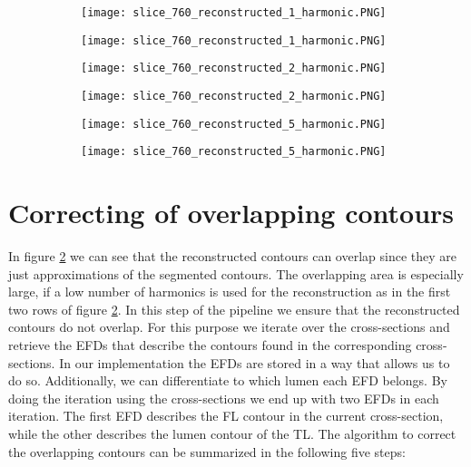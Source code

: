 \documentclass[thesis.tex]{subfiles}
\begin{document}
\begin{figure}
	\begin{subfigure}[t]{0.45\textwidth}
		\texttt{[image: slice\_760\_reconstructed\_1\_harmonic.PNG]}
	\caption{}
\label{fig:efds_reconstruction_a}		
	\end{subfigure}
\hspace{0.1\textwidth}
	\begin{subfigure}[t]{0.45\textwidth}
		\texttt{[image: slice\_760\_reconstructed\_1\_harmonic.PNG]}		
\caption{}	
	\end{subfigure}
	\begin{subfigure}[t]{0.45\textwidth}
		\texttt{[image: slice\_760\_reconstructed\_2\_harmonic.PNG]}
	\caption{}		
	\end{subfigure}
\hspace{0.1\textwidth}
	\begin{subfigure}[t]{0.45\textwidth}
		\texttt{[image: slice\_760\_reconstructed\_2\_harmonic.PNG]}		
\caption{}	
	\end{subfigure}
	\begin{subfigure}[t]{0.45\textwidth}
		\texttt{[image: slice\_760\_reconstructed\_5\_harmonic.PNG]}
	\caption{}		
	\end{subfigure}
\hspace{0.1\textwidth}
	\begin{subfigure}[t]{0.45\textwidth}
		\texttt{[image: slice\_760\_reconstructed\_5\_harmonic.PNG]}		
\caption{}	
	\end{subfigure}
	\caption{}

\label{fig:efds_reconstruction}
\end{figure}

\section{Correcting of overlapping contours}
In figure \ref{fig:efds_reconstruction} we can see that the reconstructed contours can overlap since they are just approximations of the segmented contours. The overlapping area is especially large, if a low number of harmonics is used for the reconstruction as in the first two rows of figure \ref{fig:efds_reconstruction}. In this step of the pipeline we ensure that the reconstructed contours do not overlap. For this purpose we iterate over the cross-sections and retrieve the EFDs that describe the contours found in the corresponding cross-sections. In our implementation the EFDs are stored in a way that allows us to do so. Additionally, we can differentiate to which lumen each EFD belongs. By doing the iteration using the cross-sections we end up with two EFDs in each iteration. The first EFD describes the FL contour in the current cross-section, while the other describes the lumen contour of the TL. 
The algorithm to correct the overlapping contours can be summarized in the following five steps:
\end{document}
